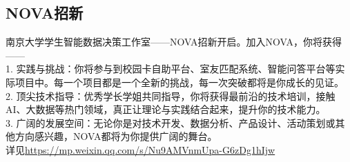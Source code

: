\documentclass[letterpaper, 12pt]{article}
\begin{document}
\begin{multicols}{2}
\section{NOVA招新}
南京大学学生智能数据决策工作室——NOVA招新开启。加入NOVA，你将获得——\\
1. 实践与挑战：你将参与到校园卡自助平台、室友匹配系统、智能问答平台等实际项目中。每一个项目都是一个全新的挑战，每一次突破都将是你成长的见证。\\
2. 顶尖技术指导：优秀学长学姐共同指导，你将获得最前沿的技术培训，接触AI、大数据等热门领域，真正让理论与实践结合起来，提升你的技术能力。\\
3. 广阔的发展空间：无论你是对技术开发、数据分析、产品设计、活动策划或其他方向感兴趣，NOVA都将为你提供广阔的舞台。\\
详见\url{https://mp.weixin.qq.com/s/Nu9AMVnmUpa-G6zDg1hIjw}
\end{multicols} 
\end{document}
